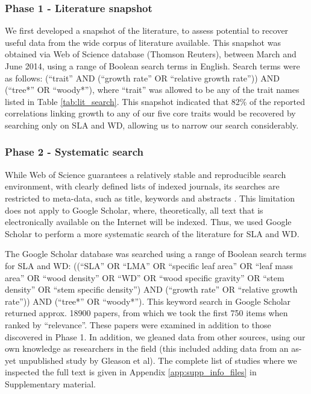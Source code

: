 \documentclass[a4paper,11pt]{article}
\begin{document}
\subsubsection*{Phase 1 - Literature snapshot}\label{literature-snapshot}

We first developed a snapshot of the literature, to assess potential to recover useful data from the wide corpus of literature available. This snapshot was obtained via Web of Science database (Thomson Reuters), between March and June 2014, using a range of Boolean search terms in English. Search terms were as follows: (``trait'' AND (``growth rate'' OR ``relative growth rate'')) AND (``tree*'' OR ``woody*''), where ``trait'' was allowed to be any of the trait names listed in Table \ref{tab:lit_search}. This snapshot indicated that 82\% of the reported correlations linking growth to any of our five core traits would be recovered by searching only on SLA and WD, allowing us to narrow our search considerably.

\subsubsection*{Phase 2 - Systematic search}\label{systematic-search}

While Web of Science guarantees a relatively stable and reproducible search environment, with clearly defined lists of indexed journals, its searches are restricted to meta-data, such as title, keywords and abstracts \citep{Beckmann:2012hn}. This limitation does not apply to Google Scholar, where, theoretically, all text that is electronically available on the Internet will be indexed. Thus, we used Google Scholar to perform a more systematic search of the literature for SLA and WD.

The Google Scholar database was searched using a range of Boolean search terms for SLA and WD: ((``SLA'' OR ``LMA'' OR ``specific leaf area'' OR ``leaf mass area'' OR ``wood density'' OR ``WD'' OR ``wood specific gravity'' OR ``stem density'' OR ``stem specific density'') AND (``growth rate'' OR ``relative growth rate'')) AND (``tree*'' OR ``woody*''). This keyword search in Google Scholar returned approx. 18900 papers, from which we took the first 750 items when ranked by ``relevance''.
These papers were examined in addition to those discovered in Phase 1. In addition, we gleaned data from other sources, using our own knowledge as researchers in the field (this included adding data from an as-yet unpublished study by Gleason et al).  The complete list of studies where we inspected the full text is given in Appendix \ref{app:supp_info_files} in Supplementary material.
\end{document}
